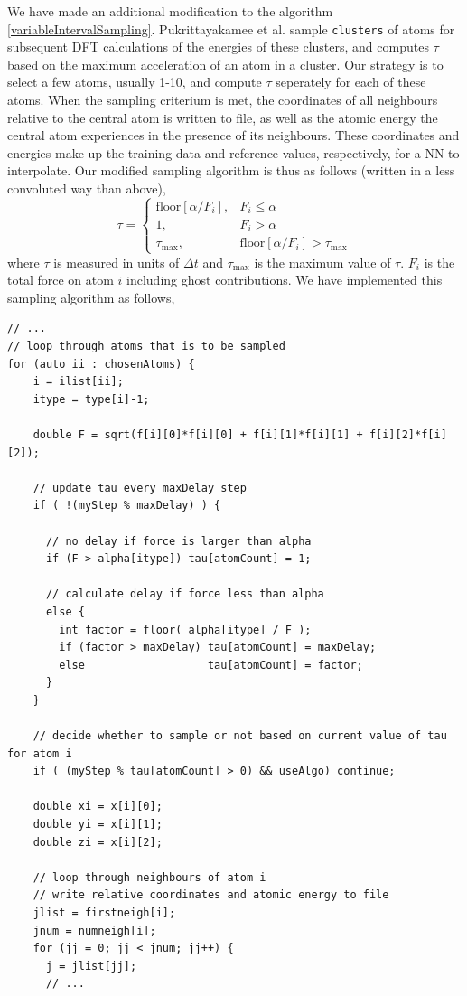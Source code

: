 \documentclass[twoside,english]{uiofysmaster}
\begin{document}
We have made an additional modification to the algorithm \eqref{variableIntervalSampling}.  
Pukrittayakamee et al. \cite{Pukrittayakamee09} sample \texttt{clusters} of atoms for subsequent DFT calculations
of the energies of these clusters, and computes $\tau$ based on the maximum acceleration of an atom in a cluster. 
Our strategy is to select a few atoms, usually 1-10, and compute $\tau$ seperately for each of these atoms. When 
the sampling criterium is met, the coordinates of all neighbours relative to the central atom is written to file, 
as well as the atomic energy the central atom experiences in the presence of its neighbours. These coordinates
and energies make up the training data and reference values, respectively, for a NN to interpolate. 
Our modified sampling algorithm is thus as follows (written in a less convoluted way than above),
\begin{equation}
 \tau = 
\begin{cases}
  \textrm{floor}\left[\alpha/F_i\right], &F_i \leq \alpha \\
  1, &F_i > \alpha \\
  \tau_\textrm{max}, &\textrm{floor}\left[\alpha/F_i\right] > \tau_\textrm{max}
\end{cases}
\label{samplingAlgorithmModified}
\end{equation}
where $\tau$ is measured in units of $\Delta t$ and $\tau_\textrm{max}$ is the maximum value of $\tau$.
$F_i$ is the total force on atom $i$ including ghost contributions. 
We have implemented this sampling algorithm as follows,
\begin{listing}[H]
\begin{verbatim}
// ...
// loop through atoms that is to be sampled
for (auto ii : chosenAtoms) {
    i = ilist[ii];
    itype = type[i]-1;

    double F = sqrt(f[i][0]*f[i][0] + f[i][1]*f[i][1] + f[i][2]*f[i][2]);

    // update tau every maxDelay step
    if ( !(myStep % maxDelay) ) {

      // no delay if force is larger than alpha
      if (F > alpha[itype]) tau[atomCount] = 1;

      // calculate delay if force less than alpha
      else {
        int factor = floor( alpha[itype] / F );
        if (factor > maxDelay) tau[atomCount] = maxDelay;
        else                   tau[atomCount] = factor;
      }
    }

    // decide whether to sample or not based on current value of tau for atom i
    if ( (myStep % tau[atomCount] > 0) && useAlgo) continue;

    double xi = x[i][0];
    double yi = x[i][1];
    double zi = x[i][2];
    
    // loop through neighbours of atom i 
    // write relative coordinates and atomic energy to file
    jlist = firstneigh[i];
    jnum = numneigh[i];
    for (jj = 0; jj < jnum; jj++) {
      j = jlist[jj];
      // ...
\end{verbatim}
\end{listing}
\end{document}
